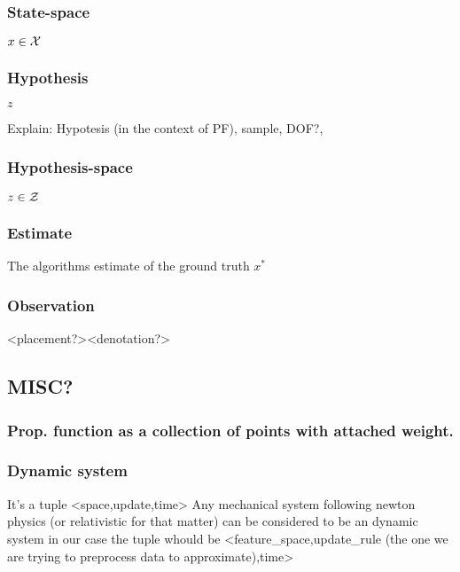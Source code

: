 \subsubsection{State-space}
$x\in\mathcal{X}$ %
\subsubsection{Hypothesis}
$z$

Explain: Hypotesis (in the context of PF), sample, DOF?, 

\subsubsection{Hypothesis-space}
$z\in\mathcal{Z}$

\subsubsection{Estimate}
The algorithms estimate of the ground truth
$x^*$ 

\subsubsection{Observation}
<placement?><denotation?>

\subsection{MISC?}

\subsubsection{Prop. function as a collection of points with attached weight.}

\subsubsection{Dynamic system}
    It's a tuple <space,update,time>
    Any mechanical system following newton physics (or relativistic for that matter) can be considered to be an dynamic system
    in our case the tuple whould be <feature\_space,update\_rule (the one we are trying to preprocess data to approximate),time>


